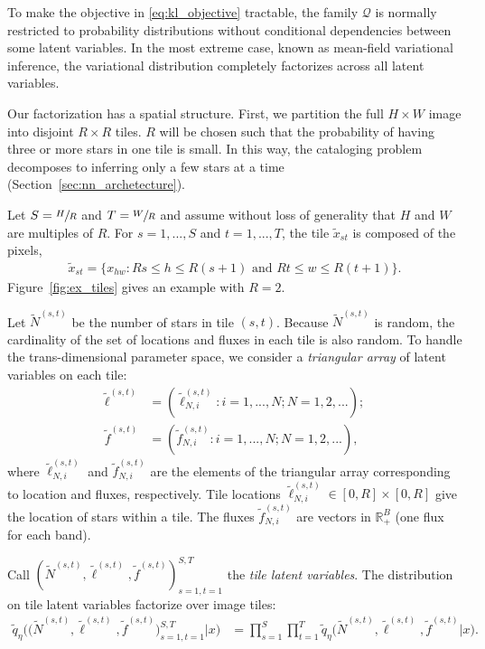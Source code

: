 To make the objective in \eqref{eq:kl_objective} tractable, the family $\mathcal{Q}$ is normally restricted to probability distributions 
without conditional dependencies between some latent variables. In the most extreme case, known as mean-field variational inference, the variational distribution completely factorizes across all latent variables. 

Our factorization has a spatial structure. 
First, we partition the full $H \times W$ image into disjoint $R \times R$ tiles. 
$R$ will be chosen such that the probability of having three or more stars in one tile is small. 
In this way, the cataloging problem decomposes to inferring only a few stars at a time (Section~\ref{sec:nn_archetecture}). 


Let $S = \sfrac{H}{R}$ and $T = \sfrac{W}{R}$ and assume without loss of generality that $H$ and $W$ are multiples of $R$.
For $s = 1, ..., S$ and $t = 1, ..., T$,
the tile $\tilde x_{st}$ is composed of the pixels,
\begin{align}
    \tilde x_{st} = \{x_{hw} : Rs \leq h \leq R(s+1) \text{ and } Rt \leq w \leq R(t+1)\}.
    \label{eq:tiles}
\end{align}
Figure~\ref{fig:ex_tiles} gives an example with $R = 2$. 

Let $\tilde N^{(s, t)}$ be the number of stars in tile $(s,t)$.
Because $\tilde N^{(s, t)}$ is random, 
the cardinality of the set of locations and fluxes in each tile
is also random. 
To handle the trans-dimensional parameter space, 
we consider a {\itshape triangular array} of latent variables
on each tile:
\begin{align}
    \tilde\ell^{(s, t)} &= (\tilde\ell_{N, i}^{(s, t)} : i = 1, ..., N; N = 1, 2, ...); \\
    \tilde f^{(s, t)} &= (\tilde f_{N, i}^{(s, t)} : i = 1, ..., N; N = 1, 2, ...),
\end{align}
where $\tilde\ell_{N, i}^{(s, t)}$ and $\tilde f_{N, i}^{(s, t)}$ are the elements of the triangular array corresponding to location and fluxes, respectively. 
Tile locations $\tilde\ell_{N, i}^{(s, t)} \in [0, R]\times[0, R]$ give the location of stars within a tile. The fluxes $\tilde f_{N, i}^{(s, t)}$ are vectors in $\mathbb{R}^B_+$ (one flux for each band). 

Call $(\tilde N^{(s, t)}, \tilde \ell^{(s, t)}, \tilde f^{(s, t)})_{s=1,t=1}^{S,T}$ the {\itshape tile latent variables}. The distribution on tile latent variables factorize over image tiles:
\begin{align}
    \tilde q_\eta\big( \big(\tilde N^{(s, t)}, \tilde \ell^{(s, t)}, \tilde f^{(s, t)}\big)_{s=1, t = 1}^{S, T}|x\big) 
    &=
    \prod_{s = 1}^S \prod_{t=1}^T
    \tilde q_\eta\big(\tilde N^{(s, t)}, \tilde \ell^{(s, t)}, \tilde f^{(s, t)} | x\big).
    \label{eq:factorize_patches}
\end{align}

